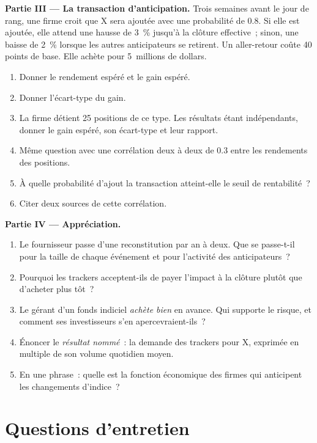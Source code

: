 \begin{problem}
\medskip\noindent\textbf{Partie III --- La transaction d'anticipation.}
Trois semaines avant le jour de rang, une firme croit que X sera ajoutée avec
une probabilité de 0.8. Si elle est ajoutée, elle attend une hausse de 3~\% jusqu'à la clôture effective~;
sinon, une baisse de 2~\% lorsque les autres anticipateurs se retirent. Un aller-retour coûte 40
points de base. Elle achète pour 5~millions de dollars.
\begin{enumerate}[resume]
\item Donner le rendement espéré et le gain espéré.
\item Donner l'écart-type du gain.
\item La firme détient 25 positions de ce type. Les résultats étant indépendants, donner
le gain espéré, son écart-type et leur rapport.
\item Même question avec une corrélation deux à deux de 0.3 entre les rendements des positions.
\item À quelle probabilité d'ajout la transaction atteint-elle le seuil de rentabilité~?
\item Citer deux sources de cette corrélation.
\end{enumerate}

\medskip\noindent\textbf{Partie IV --- Appréciation.}
\begin{enumerate}[resume]
\item Le fournisseur passe d'une reconstitution par an à deux. Que se passe-t-il
pour la taille de chaque événement et pour l'activité des anticipateurs~?
\item Pourquoi les trackers acceptent-ils de payer l'impact à la clôture plutôt que
d'acheter plus tôt~?
\item Le gérant d'un fonds indiciel \emph{achète bien} en avance. Qui supporte le risque, et
comment ses investisseurs s'en apercevraient-ils~?
\item Énoncer le \emph{résultat nommé}~: la demande des trackers pour X, exprimée en multiple
de son volume quotidien moyen.
\item En une phrase~: quelle est la fonction économique des firmes qui
anticipent les changements d'indice~?
\end{enumerate}
\end{problem}

\section{Questions d'entretien}

